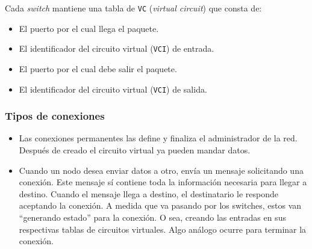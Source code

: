 \documentclass[]{article}
\begin{document}
Cada \emph{switch} mantiene una tabla de \texttt{VC} (\emph{virtual circuit}) que consta de:
\begin{itemize}
    \item El puerto por el cual llega el paquete.
    \item El identificador del circuito virtual (\texttt{VCI}) de entrada.
    \item El puerto por el cual debe salir el paquete.
    \item El identificador del circuito virtual (\texttt{VCI}) de salida.
\end{itemize}


\subsubsection{Tipos de conexiones}

\begin{itemize}
    \item Las conexiones permanentes las define y finaliza el administrador de la red. Después de creado el circuito virtual ya pueden mandar datos.
    \item Cuando un nodo desea enviar datos a otro, envía un mensaje solicitando una conexión. Este mensaje sí contiene toda la información necesaria para llegar a destino. Cuando el mensaje llega a destino, el destinatario le responde aceptando la conexión. A medida que va pasando por los switches, estos van ``generando estado'' para la conexión. O sea, creando las entradas en sus respectivas tablas de circuitos virtuales. Algo análogo ocurre para terminar la conexión.
\end{itemize}
\end{document}
